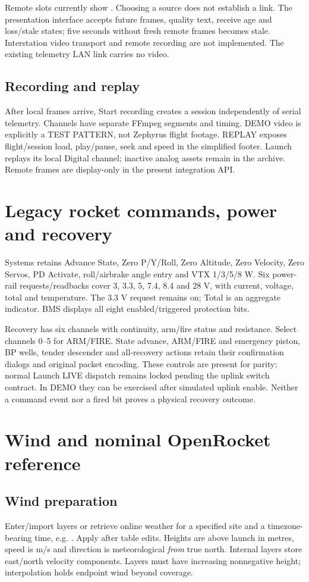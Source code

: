 Remote slots currently show . Choosing a source does
not establish a link. The presentation interface accepts future frames,
quality text, receive age and loss/stale states; five seconds without fresh
remote frames becomes stale. Interstation video transport and remote recording
are not implemented. The existing telemetry LAN link carries no video.

\subsection{Recording and replay}
After local frames arrive, Start recording creates a session independently of
serial telemetry. Channels have separate FFmpeg segments and timing. DEMO
video is explicitly a TEST PATTERN, not Zephyrus flight footage. REPLAY exposes
flight/session load, play/pause, seek and speed in the simplified footer.
Launch replays its local Digital channel; inactive analog assets remain in
the archive. Remote frames are display-only in the present integration API.

\section{Legacy rocket commands, power and recovery}\label{sec:rocket}
Systems retains Advance State, Zero P/Y/Roll, Zero Altitude, Zero Velocity,
Zero Servos, PD Activate, roll/airbrake angle entry and VTX 1/3/5/8 W. Six
power-rail requests/readbacks cover 3, 3.3, 5, 7.4, 8.4 and 28 V, with current,
voltage, total and temperature. The 3.3 V request remains on; Total is an
aggregate indicator. BMS displays all eight enabled/triggered protection bits.

Recovery has six channels with continuity, arm/fire status and resistance.
Select channels 0--5 for ARM/FIRE. State advance, ARM/FIRE and emergency piston,
BP wells, tender descender and all-recovery actions retain their confirmation
dialogs and original packet encoding. These controls are present for parity;
normal Launch LIVE dispatch remains locked pending the uplink switch contract.
In DEMO they can be exercised after simulated uplink enable. Neither a command
event nor a fired bit proves a physical recovery outcome.

\section{Wind and nominal OpenRocket reference}\label{sec:simulation}
\subsection{Wind preparation}
Enter/import layers or retrieve online weather for a specified site and a
timezone-bearing time, e.g. . Apply after table edits.
Heights are above launch in metres, speed is m/s and direction is meteorological
\emph{from} true north. Internal layers store east/north velocity components.
Layers must have increasing nonnegative height; interpolation holds endpoint
wind beyond coverage.

